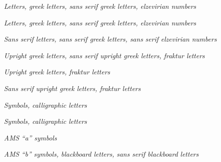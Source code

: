 \documentclass[12pt,a4paper]{article}
\begin{document}
\bigskip
\begin{center}
\textit{Letters, greek letters, sans serif greek letters, elzevirian numbers}
\end{center}
\vfill\clearpage

\bigskip
\begin{center}
\textit{Letters, greek letters, sans serif greek letters, elzevirian numbers}
\end{center}
\vfill\clearpage

\bigskip
\begin{center}
\textit{Sans serif letters, sans serif greek letters, sans serif elzevirian numbers}
\end{center}
\vfill\clearpage

\bigskip
\begin{center}
\textit{Upright greek letters, sans serif  upright greek letters, fraktur letters}
\end{center}
\vfill\clearpage

\bigskip
\begin{center}
\textit{Upright greek letters, fraktur letters}
\end{center}
\vfill\clearpage

\bigskip
\begin{center}
\textit{Sans serif upright greek letters, fraktur letters}
\end{center}
\vfill\clearpage 

\bigskip
\begin{center}
\textit{Symbols, calligraphic letters}
\end{center}
\vfill\clearpage

\bigskip
\begin{center}
\textit{Symbols, calligraphic letters}
\end{center}
\vfill\clearpage

\bigskip
\begin{center}
\textit{AMS ``a'' symbols}
\end{center}
\vfill\clearpage

\bigskip
\begin{center}
\textit{AMS ``b'' symbols, blackboard letters, sans serif blackboard letters}
\end{center}
\vfill\clearpage
\end{document}

